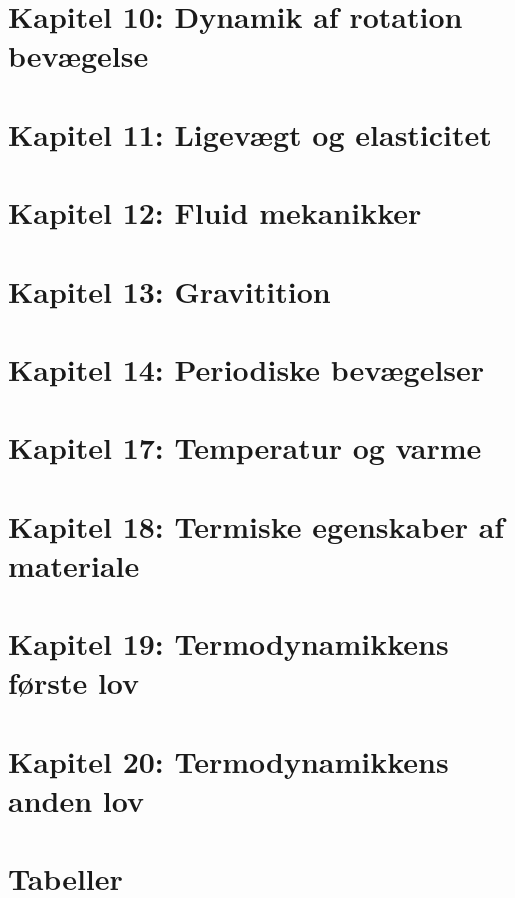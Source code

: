 \documentclass{article}
\begin{document}
{	\section{Kapitel 10: Dynamik af rotation bevægelse}
	

	\section{Kapitel 11: Ligevægt og elasticitet}
	

	\section{Kapitel 12: Fluid mekanikker}
	

	\section{Kapitel 13: Gravitition}
	

	\section{Kapitel 14: Periodiske bevægelser}
	
	
	\section{Kapitel 17: Temperatur og varme}
	

	\section{Kapitel 18: Termiske egenskaber af materiale}
	

	\section{Kapitel 19: Termodynamikkens første lov}
	

	\section{Kapitel 20: Termodynamikkens anden lov}
	

	\section{Tabeller}
}
\end{document}
